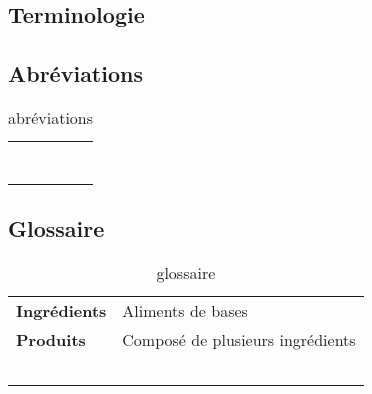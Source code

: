 \textcolor[RGB]{46, 116, 181}{\chapter{Terminologie}}
\section{Abréviations}
\begin{table}[!h]
\begin{tabular}{p{2.5cm}p{13.5cm}}
  &\\
  &\\
  &\\
  &\\
  &\\
  &\\
  &\\
\end{tabular}
\caption{abréviations}
\end{table}

\section{Glossaire}
\begin{table}[!h]
\begin{tabular}{lp{13.5cm}}
  \textbf{Ingrédients} & Aliments de bases \\
  \textbf{Produits} & Composé de plusieurs ingrédients \\
  &\\
  &\\
  &\\
  &\\
  &\\
\end{tabular}
\caption{glossaire}
\end{table}
\printglossaries
